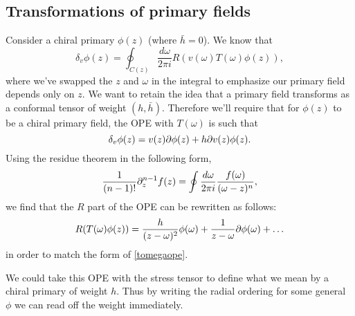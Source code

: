 \subsection*{Transformations of primary fields}
Consider a chiral primary $\phi(z)$ (where $\bar h=0$). We know that
\begin{equation}
    \delta_v \phi(z) =\oint_{C(z)} \frac{d\omega}{2\pi i} R(v(\omega)T(\omega) \phi(z)),
\end{equation}
where we've swapped the $z$ and $\omega$ in the integral to emphasize our primary field depends only on $z$. We want to retain the idea that a primary field transforms as a conformal tensor of weight $(h,\bar h).$ Therefore we'll require that for $\phi(z)$ to be a chiral primary field, the OPE with $T(\omega)$ is such that
\begin{equation}\label{tomegaope}
    \delta_v \phi(z) = v(z) \partial \phi(z) + h\partial v(z) \phi(z).
\end{equation}
Using the residue theorem in the following form,
\begin{equation}
    \frac{1}{(n-1)!} \partial_z^{n-1} f(z) = \oint \frac{d\omega}{2\pi i } \frac{f(\omega)}{(\omega-z)^n},
\end{equation}
we find that the $R$ part of the OPE can be rewritten as follows:
\begin{equation}
    R(T(\omega)\phi(z))=\frac{h}{(z-\omega)^2}\phi(\omega) + \frac{1}{z-\omega} \partial \phi(\omega)+\ldots
\end{equation}
in order to match the form of \ref{tomegaope}.

We could take this OPE with the stress tensor to define what we mean by a chiral primary of weight $h$. Thus by writing the radial ordering for some general $\phi$ we can read off the weight immediately.

